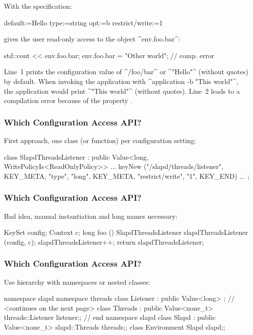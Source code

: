 \begin{frame}[fragile]
	With the specification:
	\par
	\begin{code}
	  default:=Hello
	  type:=string
	  opt:=b
	  restrict/write:=1
	\end{code}
	\par
	 gives the user read-only access to the object ^env.foo.bar^:
	\par
	\begin{code}[language=Cpp]
	std::cout << env.foo.bar;
	env.foo.bar = "Other world"; // comp. error
	\end{code}
	\par
	\small
	\pause
	Line~1 prints the configuration value of ^/foo/bar^ or ^"Hello"^ (without quotes) by default.
	When invoking the application with ^application -b "This world"^, the application would print ^"This world"^ (without quotes).
	Line~2 leads to a compilation error because of the property .
\end{frame}

\begin{frame}[fragile]
	\frametitle{Which Configuration Access API?}

	First approach, one class (or function) per configuration setting:
	\\[1em]
	\begin{code}[gobble=4,language=Cpp]
	class SlapdThreadsListener : public Value<long,
		WritePolicyIs<ReadOnlyPolicy>> {
		... keyNew ("/slapd/threads/listener",
			    KEY_META, "type", "long",
			    KEY_META, "restrict/write", "1",
			    KEY_END) ...
	};
	\end{code}
\end{frame}

\begin{frame}[fragile]
	\frametitle{Which Configuration Access API?}

	Bad idea, manual instantiation and long names necessary:
	\\[1em]
	\begin{code}[gobble=4,language=Cpp]
	KeySet config;
	Context c;
	long foo ()
	{
		SlapdThreadsListener slapdThreadsListener (config, c);
		slapdThreadsListener++;
		return slapdThreadsListener;
	}
	\end{code}
\end{frame}

\begin{frame}[fragile]
	\frametitle{Which Configuration Access API?}

	Use hierarchy with namespaces or nested classes:
	\\[1em]
	\begin{code}[gobble=4,language=Cpp]
	namespace slapd
	{
	namespace threads
	{
	class Listener : public Value<long> {};
	}  // <continues on the next page>
	class Threads : public Value<none_t>
	{threads::Listener listener;};
	}  // end namespace slapd
	class Slapd : public Value<none_t>
	{slapd::Threads threads;};
	class Environment {Slapd slapd;};
	\end{code}
\end{frame}

